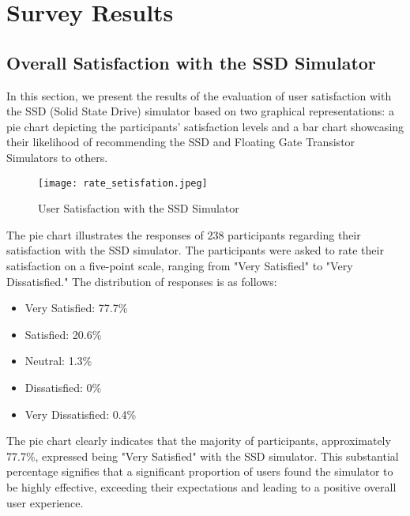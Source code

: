 \documentclass[conference]{IEEEtran}
\begin{document}
\section{Survey Results}
\subsection{Overall Satisfaction with the SSD Simulator}
In this section, we present the results of the evaluation of user satisfaction with the SSD (Solid State Drive) simulator based on two graphical representations: a pie chart depicting the participants' satisfaction levels and a bar chart showcasing their likelihood of recommending the SSD and Floating Gate Transistor Simulators to others.
\begin{figure}[h]
    \centering
    \texttt{[image: rate\_setisfation.jpeg]}
    \caption{User Satisfaction with the SSD Simulator}
    \label{fig:enter-label}
\end{figure}
The pie chart illustrates the responses of 238 participants regarding their satisfaction with the SSD simulator. The participants were asked to rate their satisfaction on a five-point scale, ranging from "Very Satisfied" to "Very Dissatisfied." The distribution of responses is as follows:
\begin{itemize}
    \item Very Satisfied: 77.7\%
    \item Satisfied: 20.6\%
    \item Neutral: 1.3\%
    \item Dissatisfied: 0\%
    \item Very Dissatisfied: 0.4\%
\end{itemize}
The pie chart clearly indicates that the majority of participants, approximately 77.7\%, expressed being "Very Satisfied" with the SSD simulator. This substantial percentage signifies that a significant proportion of users found the simulator to be highly effective, exceeding their expectations and leading to a positive overall user experience.
\end{document}
